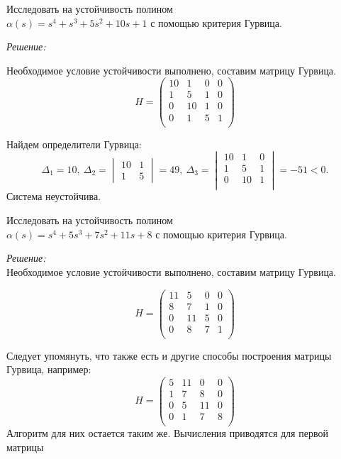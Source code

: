 \documentclass[../../TAU.tex]{subfiles}
\begin{document}
    \examp Исследовать на устойчивость полином\\
    $\alpha(s) = s^4+s^3+5s^2+10s+1$ 
    с помощью критерия Гурвица.

    \textit{Решение:}\mbox{}\

    Необходимое условие устойчивости выполнено, составим матрицу Гурвица.
    $$
        H = 
        \begin{pmatrix}
            10 & 1 & 0 & 0\\
            1 & 5 & 1 & 0 \\
            0 & 10 & 1 & 0\\
            0 & 1 & 5 & 1 \\
        \end{pmatrix}
    $$

    Найдем определители Гурвица: 
    $$
    \Delta_1=10,\ \Delta_2 = 
    \begin{vmatrix}
        10 & 1\\
        1  & 5
    \end{vmatrix}
    =49,\ \Delta_3=
    \begin{vmatrix}
        10 & 1 & 0\\
        1  & 5 & 1\\
        0 & 10 & 1\\
    \end{vmatrix}
    =-51<0.
    $$
    Система неустойчива.

    \examp Исследовать на устойчивость полином\\
    $\alpha(s) = s^4+5s^3+7s^2+11s+8$ 
    с помощью критерия Гурвица.

    {\it Решение:}\\

    Необходимое условие устойчивости выполнено, составим матрицу Гурвица.

    $$
        H = 
        \begin{pmatrix}
            11 & 5  & 0 & 0 \\
            8  & 7  & 1 & 0 \\
            0  & 11 & 5 & 0 \\
            0  & 8  & 7 & 1 \\
        \end{pmatrix}
    $$

    Следует упомянуть, что также есть и другие способы построения матрицы Гурвица, например:
    $$
        H = 
        \begin{pmatrix}
            5 & 11 & 0  & 0 \\
            1 & 7  & 8  & 0 \\
            0 & 5  & 11 & 0 \\
            0 & 1  & 7  & 8 \\
        \end{pmatrix}
    $$
    Алгоритм для них остается таким же. Вычисления приводятся для первой матрицы
\end{document}
